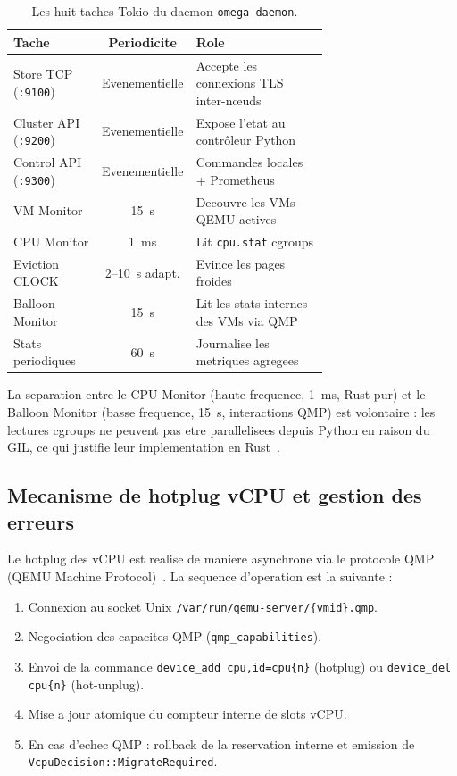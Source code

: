 \begin{table}[htbp]
    \centering
    \caption{Les huit taches Tokio du daemon \texttt{omega-daemon}.}
    \label{tab:tokio-tasks}
    \begin{tabular}{p{0.28\linewidth} c p{0.42\linewidth}}
        \toprule
        \textbf{Tache} & \textbf{Periodicite} & \textbf{Role} \\
        \midrule
        Store TCP (\texttt{:9100}) & Evenementielle & Accepte les connexions TLS inter-n\oe{}uds \\
        Cluster API (\texttt{:9200}) & Evenementielle & Expose l'etat au contr\^oleur Python \\
        Control API (\texttt{:9300}) & Evenementielle & Commandes locales + Prometheus \\
        VM Monitor & 15~s & Decouvre les VMs QEMU actives \\
        CPU Monitor & 1~ms & Lit \texttt{cpu.stat} cgroups \\
        Eviction CLOCK & 2--10~s adapt. & Evince les pages froides \\
        Balloon Monitor & 15~s & Lit les stats internes des VMs via QMP \\
        Stats periodiques & 60~s & Journalise les metriques agregees \\
        \bottomrule
    \end{tabular}
\end{table}

La separation entre le CPU Monitor (haute frequence, 1~ms, Rust pur) et le Balloon Monitor (basse frequence, 15~s, interactions QMP) est volontaire : les lectures cgroups ne peuvent pas etre parallelisees depuis Python en raison du GIL, ce qui justifie leur implementation en Rust~\cite{rust_lang}.

\subsection{Mecanisme de hotplug vCPU et gestion des erreurs}
\label{subsec:impl-hotplug}

Le hotplug des vCPU est realise de maniere asynchrone via le protocole QMP (QEMU Machine Protocol)~\cite{qemu_doc}. La sequence d'operation est la suivante :

\begin{enumerate}
    \item Connexion au socket Unix \texttt{/var/run/qemu-server/\{vmid\}.qmp}.
    \item Negociation des capacites QMP (\texttt{qmp\_capabilities}).
    \item Envoi de la commande \texttt{device\_add cpu,id=cpu\{n\}} (hotplug) ou \texttt{device\_del cpu\{n\}} (hot-unplug).
    \item Mise a jour atomique du compteur interne de slots vCPU.
    \item En cas d'echec QMP : rollback de la reservation interne et emission de \texttt{VcpuDecision::MigrateRequired}.
\end{enumerate}

